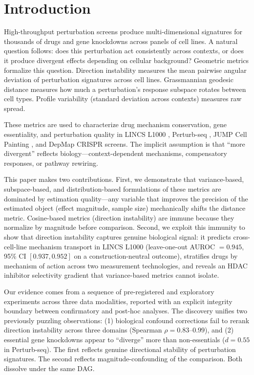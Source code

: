 \documentclass[11pt]{article}
\begin{document}
\section{Introduction}

High-throughput perturbation screens produce multi-dimensional signatures
for thousands of drugs and gene knockdowns across panels of cell lines.
A natural question follows: does this perturbation act consistently
across contexts, or does it produce divergent effects depending on
cellular background? Geometric metrics formalize this question.
Direction instability measures the mean pairwise angular deviation of
perturbation signatures across cell lines. Grassmannian geodesic
distance measures how much a perturbation's response subspace rotates
between cell types. Profile variability (standard deviation across
contexts) measures raw spread.

These metrics are used to characterize drug mechanism conservation, gene
essentiality, and perturbation quality in LINCS L1000
\citep{subramanian2017next}, Perturb-seq \citep{replogle2022mapping},
JUMP Cell Painting \citep{chandrasekaran2023jump}, and DepMap CRISPR
screens. The implicit assumption is that ``more divergent'' reflects
biology---context-dependent mechanisms, compensatory responses, or
pathway rewiring.

This paper makes two contributions. First, we demonstrate that
variance-based, subspace-based, and distribution-based formulations of
these metrics are dominated by estimation quality---any variable that
improves the precision of the estimated object (effect magnitude, sample
size) mechanically shifts the distance metric. Cosine-based metrics
(direction instability) are immune because they normalize by magnitude
before comparison. Second, we exploit this immunity to show that
direction instability captures genuine biological signal: it predicts
cross-cell-line mechanism transport in LINCS L1000 (leave-one-out AUROC
$= 0.945$, 95\% CI $[0.937, 0.952]$ on a construction-neutral outcome),
stratifies drugs by mechanism of action across two measurement
technologies, and reveals an HDAC inhibitor selectivity gradient that
variance-based metrics cannot isolate.

Our evidence comes from a sequence of pre-registered and exploratory
experiments across three data modalities, reported with an explicit
integrity boundary between confirmatory and post-hoc analyses.
The discovery unifies two previously puzzling observations: (1)
biological confound corrections fail to rerank direction instability
across three domains (Spearman $\rho = 0.83$--$0.99$), and (2) essential
gene knockdowns appear to ``diverge'' more than non-essentials ($d =
0.55$ in Perturb-seq). The first reflects genuine directional stability
of perturbation signatures. The second reflects magnitude-confounding of
the comparison. Both dissolve under the same DAG.
\end{document}
